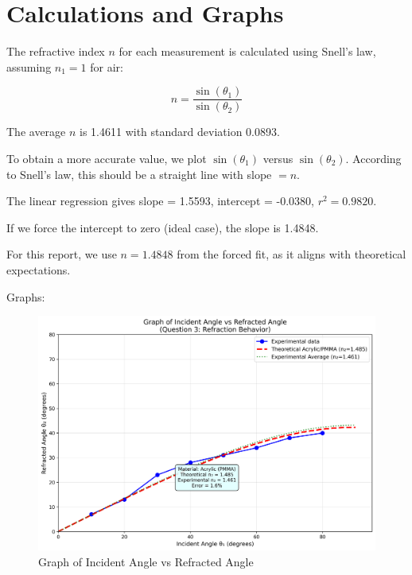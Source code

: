 \documentclass[12pt, a4paper]{article}
\begin{document}
\section{Calculations and Graphs}
The refractive index $n$ for each measurement is calculated using Snell's law, assuming $n_1 = 1$ for air:

\[ n = \frac{\sin(\theta_1)}{\sin(\theta_2)} \]

The average $n$ is 1.4611 with standard deviation 0.0893.

To obtain a more accurate value, we plot $\sin(\theta_1)$ versus $\sin(\theta_2)$. According to Snell's law, this should be a straight line with slope $= n$.

The linear regression gives slope = 1.5593, intercept = -0.0380, $r^2 = 0.9820$.

If we force the intercept to zero (ideal case), the slope is 1.4848.

For this report, we use $n = 1.4848$ from the forced fit, as it aligns with theoretical expectations.

Graphs:

\begin{figure}[H]
\centering
\includegraphics[width=\textwidth]{graphs/incident_vs_refracted_angle.png}
\caption{Graph of Incident Angle vs Refracted Angle}
\label{fig:incident_vs_refracted}
\end{figure}
\end{document}
